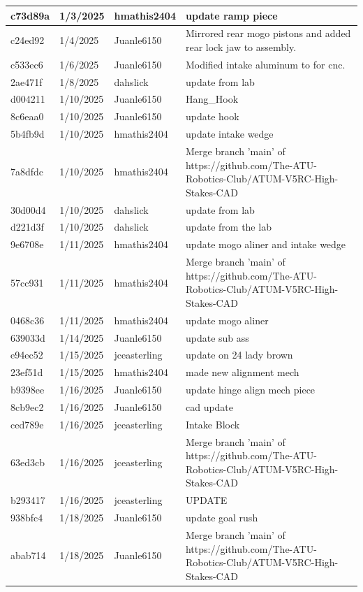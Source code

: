 \begin{center}
\begin{longtable}{|p{28pt}|p{33pt}|p{40pt}|p{300pt}|}
\hline
c73d89a & 1/3/2025 & hmathis2404 & update ramp piece \\
\hline
c24ed92 & 1/4/2025 & Juanle6150 & Mirrored rear mogo pistons and added rear lock jaw to assembly. \\
\hline
c533ec6 & 1/6/2025 & Juanle6150 & Modified intake aluminum to for cnc. \\
\hline
2ae471f & 1/8/2025 & dahslick & update from lab \\
\hline
d004211 & 1/10/2025 & Juanle6150 & Hang_Hook \\
\hline
8c6eaa0 & 1/10/2025 & Juanle6150 & update hook \\
\hline
5b4fb9d & 1/10/2025 & hmathis2404 & update intake wedge \\
\hline
7a8dfdc & 1/10/2025 & hmathis2404 & Merge branch 'main' of https://github.com/The-ATU-Robotics-Club/ATUM-V5RC-High-Stakes-CAD \\
\hline
30d00d4 & 1/10/2025 & dahslick & update from lab \\
\hline
d221d3f & 1/10/2025 & dahslick & update from the lab \\
\hline
9e6708e & 1/11/2025 & hmathis2404 & update mogo aliner and intake wedge \\
\hline
57cc931 & 1/11/2025 & hmathis2404 & Merge branch 'main' of https://github.com/The-ATU-Robotics-Club/ATUM-V5RC-High-Stakes-CAD \\
\hline
0468c36 & 1/11/2025 & hmathis2404 & update mogo aliner \\
\hline
639033d & 1/14/2025 & Juanle6150 & update sub ass \\
\hline
e94ec52 & 1/15/2025 & jceasterling & update on 24 lady brown \\
\hline
23ef51d & 1/15/2025 & hmathis2404 & made new alignment mech \\
\hline
b9398ee & 1/16/2025 & Juanle6150 & update hinge align mech piece \\
\hline
8cb9ec2 & 1/16/2025 & Juanle6150 & cad update \\
\hline
ced789e & 1/16/2025 & jceasterling & Intake Block \\
\hline
63ed3cb & 1/16/2025 & jceasterling & Merge branch 'main' of https://github.com/The-ATU-Robotics-Club/ATUM-V5RC-High-Stakes-CAD \\
\hline
b293417 & 1/16/2025 & jceasterling & UPDATE \\
\hline
938bfc4 & 1/18/2025 & Juanle6150 & update goal rush \\
\hline
abab714 & 1/18/2025 & Juanle6150 & Merge branch 'main' of https://github.com/The-ATU-Robotics-Club/ATUM-V5RC-High-Stakes-CAD \\

\end{longtable}
\end{center}
